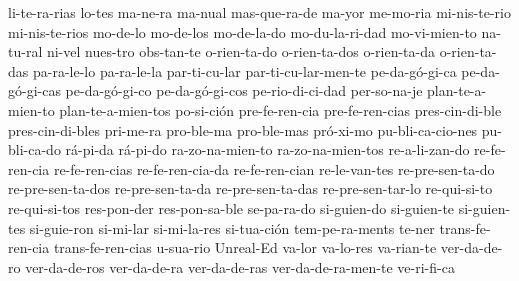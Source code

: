 {li-te-ra-rias
lo-tes
ma-ne-ra
ma-nual
mas-que-ra-de
ma-yor
me-mo-ria
mi-nis-te-rio
mi-nis-te-rios
mo-de-lo
mo-de-los
mo-de-la-do
mo-du-la-ri-dad
mo-vi-mien-to
na-tu-ral
ni-vel
nues-tro
obs-tan-te
o-rien-ta-do
o-rien-ta-dos
o-rien-ta-da
o-rien-ta-das
pa-ra-le-lo
pa-ra-le-la
par-ti-cu-lar
par-ti-cu-lar-men-te
pe-da-gó-gi-ca
pe-da-gó-gi-cas
pe-da-gó-gi-co
pe-da-gó-gi-cos
pe-rio-di-ci-dad
per-so-na-je
plan-te-a-mien-to
plan-te-a-mien-tos
po-si-ción
pre-fe-ren-cia
pre-fe-ren-cias
pres-cin-di-ble
pres-cin-di-bles
pri-me-ra
pro-ble-ma
pro-ble-mas
pró-xi-mo
pu-bli-ca-cio-nes
pu-bli-ca-do
rá-pi-da
rá-pi-do
ra-zo-na-mien-to
ra-zo-na-mien-tos
re-a-li-zan-do
re-fe-ren-cia
re-fe-ren-cias
re-fe-ren-cia-da
re-fe-ren-cian
re-le-van-tes
re-pre-sen-ta-do
re-pre-sen-ta-dos
re-pre-sen-ta-da
re-pre-sen-ta-das
re-pre-sen-tar-lo
re-qui-si-to
re-qui-si-tos
res-pon-der
res-pon-sa-ble
se-pa-ra-do
si-guien-do
si-guien-te
si-guien-tes
si-guie-ron
si-mi-lar
si-mi-la-res
si-tua-ción
tem-pe-ra-ments
te-ner
trans-fe-ren-cia
trans-fe-ren-cias
u-sua-rio
Unreal-Ed
va-lor
va-lo-res
va-rian-te
ver-da-de-ro
ver-da-de-ros
ver-da-de-ra
ver-da-de-ras
ver-da-de-ra-men-te
ve-ri-fi-ca
}